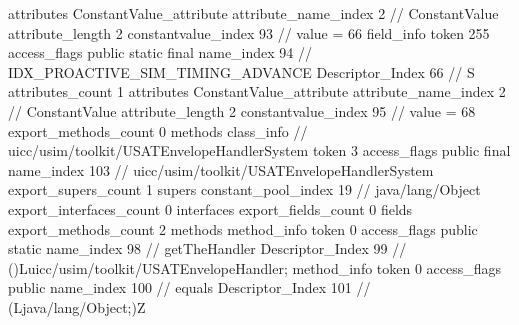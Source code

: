 {{{{{				attributes {
				ConstantValue_attribute {
					attribute_name_index	2		// ConstantValue
					attribute_length	2
					constantvalue_index	93		// value = 66
				}
				}
			}
			field_info {
				token	255
				access_flags	public static final
				name_index	94		// IDX_PROACTIVE_SIM_TIMING_ADVANCE
				Descriptor_Index	66		// S
				attributes_count	1
				attributes {
				ConstantValue_attribute {
					attribute_name_index	2		// ConstantValue
					attribute_length	2
					constantvalue_index	95		// value = 68
				}
				}
			}
			}
			export_methods_count	0
			methods {
			}
		}
		class_info {		// uicc/usim/toolkit/USATEnvelopeHandlerSystem
			token	3
			access_flags	public final
			name_index	103		// uicc/usim/toolkit/USATEnvelopeHandlerSystem
			export_supers_count	1
			supers {
				constant_pool_index	19		// java/lang/Object
			}
			export_interfaces_count	0
			interfaces {
			}
			export_fields_count	0
			fields {
			}
			export_methods_count	2
			methods {
				method_info {
					token	0
					access_flags	public static
					name_index	98		// getTheHandler
					Descriptor_Index	99		// ()Luicc/usim/toolkit/USATEnvelopeHandler;
				}
				method_info {
					token	0
					access_flags	public
					name_index	100		// equals
					Descriptor_Index	101		// (Ljava/lang/Object;)Z
				}
			}
		}
	}
}
